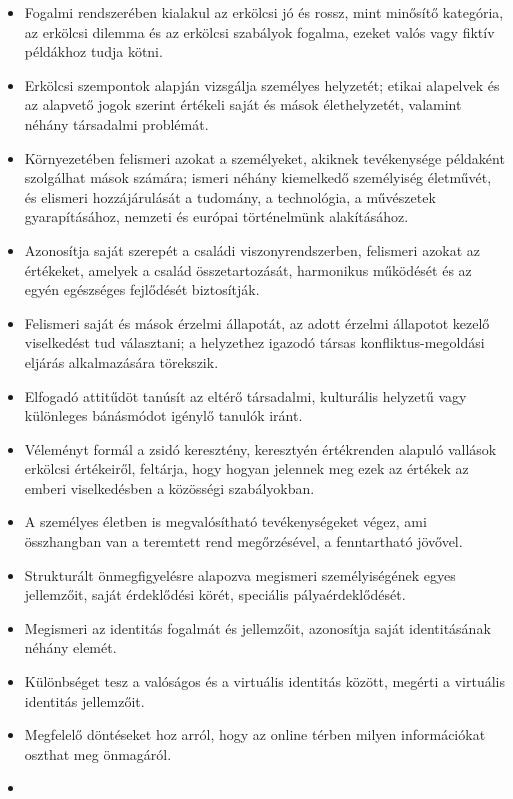 \begin{itemize}
\item
  Fogalmi rendszerében kialakul az erkölcsi jó és rossz, mint minősítő
  kategória, az erkölcsi dilemma és az erkölcsi szabályok fogalma,
  ezeket valós vagy fiktív példákhoz tudja kötni.
\item
  Erkölcsi szempontok alapján vizsgálja személyes helyzetét; etikai
  alapelvek és az alapvető jogok szerint értékeli saját és mások
  élethelyzetét, valamint néhány társadalmi problémát.
\item
  Környezetében felismeri azokat a személyeket, akiknek tevékenysége
  példaként szolgálhat mások számára; ismeri néhány kiemelkedő
  személyiség életművét, és elismeri hozzájárulását a tudomány, a
  technológia, a művészetek gyarapításához, nemzeti és európai
  történelmünk alakításához.
\item
  Azonosítja saját szerepét a családi viszonyrendszerben, felismeri
  azokat az értékeket, amelyek a család összetartozását, harmonikus
  működését és az egyén egészséges fejlődését biztosítják.
\item
  Felismeri saját és mások érzelmi állapotát, az adott érzelmi állapotot
  kezelő viselkedést tud választani; a helyzethez igazodó társas
  konfliktus-megoldási eljárás alkalmazására törekszik.
\item
  Elfogadó attitűdöt tanúsít az eltérő társadalmi, kulturális helyzetű
  vagy különleges bánásmódot igénylő tanulók iránt.
\item
  Véleményt formál a zsidó keresztény, keresztyén értékrenden alapuló
  vallások erkölcsi értékeiről, feltárja, hogy hogyan jelennek meg ezek
  az értékek az emberi viselkedésben a közösségi szabályokban.
\item
  A személyes életben is megvalósítható tevékenységeket végez, ami
  összhangban van a teremtett rend megőrzésével, a fenntartható jövővel.
\item
  Strukturált önmegfigyelésre alapozva megismeri személyiségének egyes
  jellemzőit, saját érdeklődési körét, speciális pályaérdeklődését.
\item
  Megismeri az identitás fogalmát és jellemzőit, azonosítja saját
  identitásának néhány elemét.
\item
  Különbséget tesz a valóságos és a virtuális identitás között, megérti
  a virtuális identitás jellemzőit.
\item
  Megfelelő döntéseket hoz arról, hogy az online térben milyen
  információkat oszthat meg önmagáról.
\item

\end{itemize}
